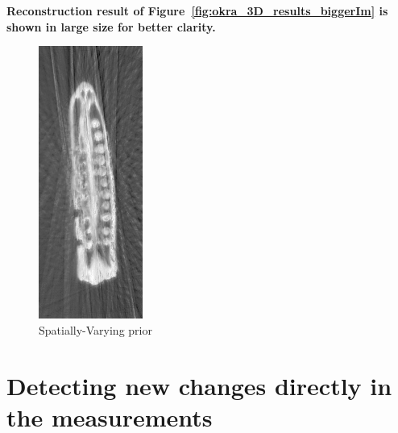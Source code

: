 \documentclass{article}
\begin{document}
\textbf{Reconstruction result of Figure~\ref{fig:okra_3D_results_biggerIm}   is shown in large size for better clarity.}
\begin{figure}[!h]
\centering
       \includegraphics[width=0.5\columnwidth]{../images/okra/prior_weighted_cropped.png}
\captionsetup{labelformat=empty}
        \caption{\large{Spatially-Varying prior}}
\end{figure}
\newpage

\section{Detecting new changes directly in the measurements}
\end{document}
